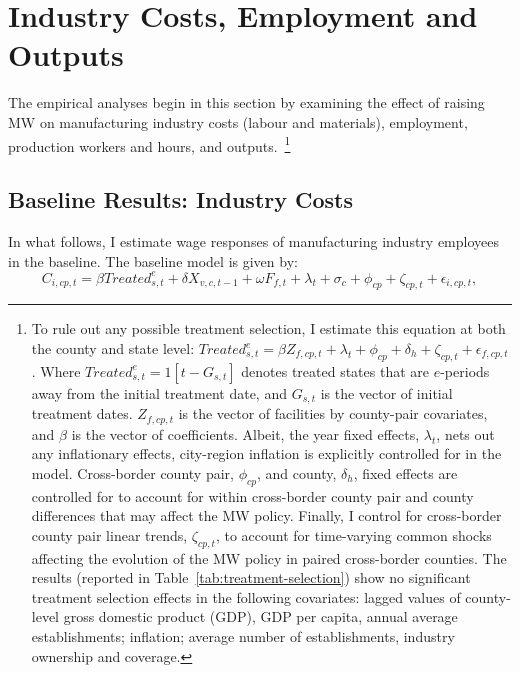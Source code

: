 \documentclass[authoryear, preprint, twocolumn, 1p]{elsarticle}
\begin{document}
    \section{Industry Costs, Employment and Outputs}\label{sec:industry-costs-employment-and-outputs}
    The empirical analyses begin in this section by examining the effect of raising MW on manufacturing industry costs (labour and materials), employment, production workers and hours, and outputs.~\footnote{\tiny To rule out any possible treatment selection, I estimate this equation at both the county and state level: $Treated_{s,t}^e = \beta Z_{f,cp,t} + \lambda_{t} + \phi_{cp} + \delta_{h} + \zeta_{cp,t} + \epsilon_{f,cp,t}$. Where $Treated_{s,t}^e = 1[t - G_{s,t}]$ denotes treated states that are $e$-periods away from the initial treatment date, and $G_{s,t}$ is the vector of initial treatment dates. $Z_{f,cp,t}$ is the vector of facilities by county-pair covariates, and $\beta$ is the vector of coefficients. Albeit, the year fixed effects, $\lambda_{t}$, nets out any inflationary effects, city-region inflation is explicitly controlled for in the model. Cross-border county pair, $\phi_{cp}$, and county, $\delta_{h}$, fixed effects are controlled for to account for within cross-border county pair and county differences that may affect the MW policy. Finally, I control for cross-border county pair linear trends, $\zeta_{cp,t}$, to account for time-varying common shocks affecting the evolution of the MW policy in paired cross-border counties. The results (reported in Table~\ref{tab:treatment-selection}) show no significant treatment selection effects in the following covariates: lagged values of county-level gross domestic product (GDP), GDP per capita, annual average establishments; inflation; average number of establishments, industry ownership and coverage.}

    \subsection{Baseline Results: Industry Costs}\label{subsec:baseline-results-industry-costs}
    In what follows, I estimate wage responses of manufacturing industry employees in the baseline. The baseline model is given by:
    \begin{equation}
        C_{i,cp,t} = \beta Treated_{s,t}^e + \delta X_{v,c,t-1} + \omega F_{f,t} + \lambda_{t} + \sigma_{c} + \phi_{cp} + \zeta_{cp,t} + \epsilon_{i,cp,t},\label{eq:baseline-wages}
    \end{equation}
\end{document}
